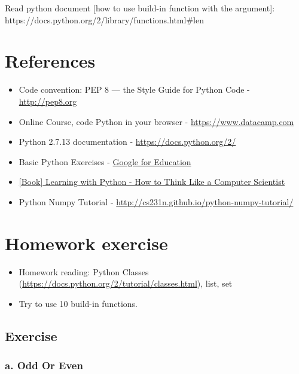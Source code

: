 \documentclass[11pt]{article}
\providecommand{\tightlist}{%
      \setlength{\itemsep}{0pt}\setlength{\parskip}{0pt}}
\begin{document}
    Read python document {[}how to use build-in function with the
argument{]}: https://docs.python.org/2/library/functions.html\#len

    \section{References}\label{references}

\begin{itemize}
\tightlist
\item
  Code convention: PEP 8 --- the Style Guide for Python Code -
  \url{http://pep8.org}
\item
  Online Course, code Python in your browser -
  \href{https://www.datacamp.com/courses/intro-to-python-for-data-science}{https://www.datacamp.com}
\item
  Python 2.7.13 documentation - \url{https://docs.python.org/2/}
\item
  Basic Python Exercises -
  \href{https://developers.google.com/edu/python/exercises/basic}{Google
  for Education}
\item
  \href{http://greenteapress.com/wp/learning-with-python/}{{[}Book{]}
  Learning with Python - How to Think Like a Computer Scientist}
\item
  Python Numpy Tutorial -
  \url{http://cs231n.github.io/python-numpy-tutorial/}
\end{itemize}

    \section{Homework exercise}\label{homework-exercise}

\begin{itemize}
\tightlist
\item
  Homework reading: Python Classes
  (\url{https://docs.python.org/2/tutorial/classes.html}), list, set
\item
  Try to use 10 build-in functions.
\end{itemize}

    \subsection{Exercise}\label{exercise}

\subsubsection{a. Odd Or Even}\label{a.-odd-or-even}
\end{document}
